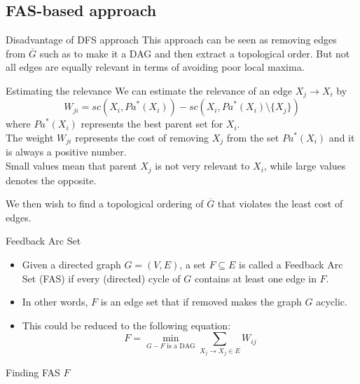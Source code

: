 \subsection{FAS-based approach}
	\begin{frame}
		\begin{block}{Disadvantage of DFS approach}
			This approach can be seen as removing edges from $\overline G$ such as to make it a DAG and then extract a topological order. But not all edges are equally relevant in terms of avoiding poor local maxima.
		\end{block}		
	\end{frame}
	\begin{frame}
		\begin{block}{Estimating the relevance}
			We can estimate the relevance of an edge $X_j \rightarrow X_i$ by
			\[ W_{ji} = {sc}( X_i , {Pa}^*( X_i ) ) - {sc}( X_i , {Pa}^*( X_i ) \setminus \{ X_j \} ) \]
			where ${Pa}^*( X_i )$ represents the \alert{best parent set} for $X_i$.\\
			The weight $W_{ji}$ represents the cost of removing $X_j$ from the set ${Pa}^*( X_i )$ and it is always a positive number.\\
			Small values mean that parent $X_j$ is not very relevant to $X_i$, while large values denotes the opposite.
		\end{block}
		We then wish to find a topological ordering of $\overline G$ that violates the least cost of edges.
	\end{frame}
	\begin{frame}
		\begin{block}{Feedback Arc Set}
			\begin{itemize}
				\item Given a directed graph $G = ( V , E )$, a set $F \subseteq E$ is called a Feedback Arc Set (FAS) if every (directed) cycle of $G$ contains at least one edge in $F$.\\
				\item In other words, $F$ is an edge set that if removed makes the graph $G$ acyclic.\\
				\item This could be reduced to the following equation:
					\[ F = \min_{G-F \text{ is a DAG}} \sum_{X_j \rightarrow X_j \in E} W_{ij} \]
			\end{itemize}
		\end{block}
	\end{frame}
	\begin{frame}{Finding FAS $F$}
		
	\end{frame}
